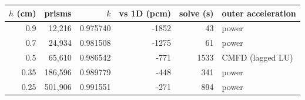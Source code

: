 \begin{tabular}{rrrrrl}
\hline
$h$ (cm) & prisms & $k$ & vs 1D (pcm) & solve (s) & outer acceleration\\
\hline
0.9 & 12,216 & 0.975740 & -1852 & 43 & power\\
0.7 & 24,934 & 0.981508 & -1275 & 61 & power\\
0.5 & 65,610 & 0.986542 & -771 & 1533 & CMFD (lagged LU)\\
0.35 & 186,596 & 0.989779 & -448 & 341 & power\\
0.25 & 501,906 & 0.991551 & -271 & 894 & power\\
\hline
\end{tabular}
